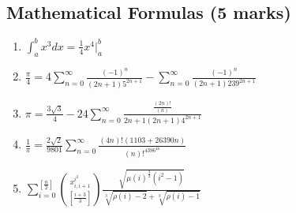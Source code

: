 \documentclass[english,12pt]{article}
\begin{document}
\subsection{Mathematical Formulas (5 marks)}
\boldmath
\begin{enumerate}
	\item $\displaystyle\int_a^b x^3 dx=\frac{1}{4}x^4\bigg\rvert_a^b$
	\item $\displaystyle\frac{\pi}{4}=4\sum\limits_{n=0}^{\infty}\frac{(-1)^n}{(2n+1)5^{2n+1}}-\sum\limits_{n=0}^\infty\frac{(-1)^n}{(2n+1)239^{2n+1}}$
	\item $\displaystyle\pi=\frac{3\sqrt{3}}{4}-24\sum\limits_{n=0}^{\infty}\frac{\frac{(2n)!}{(n)}}{2n+1(2n+1)4^{2n+1}}$
	\item $\displaystyle\frac{1}{\pi}=\frac{2\sqrt{2}}{9801}\sum\limits_{n=0}^{\infty}\frac{(4n)!(1103+26390n)}{(n)!^4396^{4n}}$
	\item $\displaystyle\sum\nolimits_{i=0}^{\left[\frac{n}{2} \right]}\binom{x^{i^2}_{i,i+1}}{\left[\frac{i+3}{3}\right]} \frac{\sqrt{\mu(i)^{\frac{3}{2}}(i^2-1)}}{\sqrt[3]{\rho(i)-2}+\sqrt[3]{\rho(i)-1}}$
\end{enumerate}
\newpage
\end{document}
